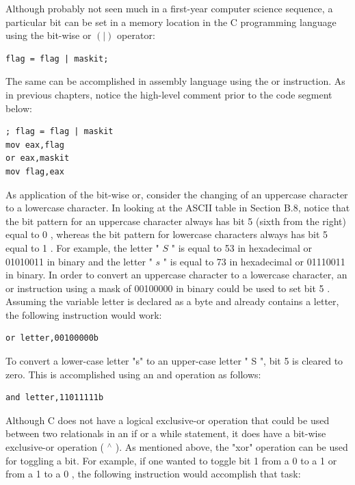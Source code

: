 \documentclass[10pt]{book}
\begin{document}
Although probably not seen much in a first-year computer science sequence, a particular bit can be set in a memory location in the C programming language using the bit-wise or $(\mid)$ operator:

\begin{verbatim}
flag = flag | maskit;
\end{verbatim}

The same can be accomplished in assembly language using the or instruction. As in previous chapters, notice the high-level comment prior to the code segment below:

\begin{verbatim}
; flag = flag | maskit
mov eax,flag
or eax,maskit
mov flag,eax
\end{verbatim}

As application of the bit-wise or, consider the changing of an uppercase character to a lowercase character. In looking at the ASCII table in Section B.8, notice that the bit pattern for an uppercase character always has bit 5 (sixth from the right) equal to 0 , whereas the bit pattern for lowercase characters always has bit 5 equal to 1 . For example, the letter " $S$ " is equal to 53 in hexadecimal or 01010011 in binary and the letter " $s$ " is equal to 73 in hexadecimal or 01110011 in binary. In order to convert an uppercase character to a lowercase character, an or instruction using a mask of 00100000 in binary could be used to set bit 5 . Assuming the variable letter is declared as a byte and already contains a letter, the following instruction would work:

\begin{verbatim}
or letter,00100000b
\end{verbatim}

To convert a lower-case letter "s" to an upper-case letter " S ", bit 5 is cleared to zero. This is accomplished using an and operation as follows:

\begin{verbatim}
and letter,11011111b
\end{verbatim}

Although C does not have a logical exclusive-or operation that could be used between two relationals in an if or a while statement, it does have a bit-wise exclusive-or operation ( ${ }^{\wedge}$ ). As mentioned above, the "xor" operation can be used for toggling a bit. For example, if one wanted to toggle bit 1 from a 0 to a 1 or from a 1 to a 0 , the following instruction would accomplish that task:
\end{document}
